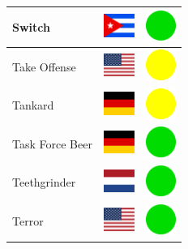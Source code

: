 \documentclass[12pt, a4paper, twoside]{report}
\begin{document}
\begin{center}
\begin{longtable}{|p{5cm}|p{2cm}|p{2cm}|}
Switch & \includegraphics[width=1cm]{4x3/cu} & \includegraphics[width=1cm]{likes/y} \\ \hline
Take Offense & \includegraphics[width=1cm]{4x3/us} & \includegraphics[width=1cm]{likes/m} \\ \hline
Tankard & \includegraphics[width=1cm]{4x3/de} & \includegraphics[width=1cm]{likes/m} \\ \hline
Task Force Beer & \includegraphics[width=1cm]{4x3/de} & \includegraphics[width=1cm]{likes/y} \\ \hline
Teethgrinder & \includegraphics[width=1cm]{4x3/nl} & \includegraphics[width=1cm]{likes/y} \\ \hline
Terror & \includegraphics[width=1cm]{4x3/us} & \includegraphics[width=1cm]{likes/y} \\ \hline

\end{longtable}
\end{center}
\end{document}
